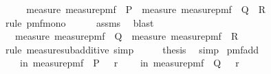 \begin{isabellebody}
%
\isadelimproof
%
\endisadelimproof
%
\isatagproof
{}\isamarkupfalse%
\ {\isacharminus}{\kern0pt}\isanewline
\ \ \isamarkupfalse%
\ {\isachardoublequoteopen}measure\ {\isacharparenleft}{\kern0pt}measure{\isacharunderscore}{\kern0pt}pmf\ {\isasymOmega}{\isacharparenright}{\kern0pt}\ P\ {\isasymle}\ measure\ {\isacharparenleft}{\kern0pt}measure{\isacharunderscore}{\kern0pt}pmf\ {\isasymOmega}{\isacharparenright}{\kern0pt}\ {\isacharparenleft}{\kern0pt}Q\ {\isasymunion}\ R{\isacharparenright}{\kern0pt}{\isachardoublequoteclose}\isanewline
\ \ \ \ \isamarkupfalse%
\ {\isacharparenleft}{\kern0pt}rule\ pmf{\isacharunderscore}{\kern0pt}mono{\isacharunderscore}{\kern0pt}{}{\isacharparenright}{\kern0pt}\isanewline
\ \ \ \ \isamarkupfalse%
\ assms\ \isamarkupfalse%
\ blast\isanewline
\ \ \isamarkupfalse%
\ \isamarkupfalse%
\ {\isachardoublequoteopen}{\isachardot}{\kern0pt}{\isachardot}{\kern0pt}{\isachardot}{\kern0pt}\ {\isasymle}\ measure\ {\isacharparenleft}{\kern0pt}measure{\isacharunderscore}{\kern0pt}pmf\ {\isasymOmega}{\isacharparenright}{\kern0pt}\ Q\ {\isacharplus}{\kern0pt}\ measure\ {\isacharparenleft}{\kern0pt}measure{\isacharunderscore}{\kern0pt}pmf\ {\isasymOmega}{\isacharparenright}{\kern0pt}\ R{\isachardoublequoteclose}\isanewline
\ \ \ \ \isamarkupfalse%
\ {\isacharparenleft}{\kern0pt}rule\ measure{\isacharunderscore}{\kern0pt}subadditive{\isacharcomma}{\kern0pt}\ simp{\isacharplus}{\kern0pt}{\isacharparenright}{\kern0pt}\isanewline
\ \ \isamarkupfalse%
\ \isamarkupfalse%
\ {\isacharquery}{\kern0pt}thesis\ \isamarkupfalse%
\ simp\isanewline
{}\isamarkupfalse%
%
\endisatagproof
{\isafoldproof}%
%
\isadelimproof
\isanewline
%
\endisadelimproof
\isanewline
{}\isamarkupfalse%
\ pmf{\isacharunderscore}{\kern0pt}add{\isacharunderscore}{\kern0pt}{}{\isacharcolon}{\kern0pt}\isanewline
\ \ \ {\isachardoublequoteopen}{\isasymP}{\isacharparenleft}{\kern0pt}{\isasymomega}\ in\ measure{\isacharunderscore}{\kern0pt}pmf\ {\isasymOmega}{\isachardot}{\kern0pt}\ P\ {\isasymomega}{\isacharparenright}{\kern0pt}\ {\isasymle}\ r{}{\isachardoublequoteclose}\isanewline
\ \ \ {\isachardoublequoteopen}{\isasymP}{\isacharparenleft}{\kern0pt}{\isasymomega}\ in\ measure{\isacharunderscore}{\kern0pt}pmf\ {\isasymOmega}{\isachardot}{\kern0pt}\ Q\ {\isasymomega}{\isacharparenright}{\kern0pt}\ {\isasymle}\ r{}{\isachardoublequoteclose}\isanewline

\end{isabellebody}

